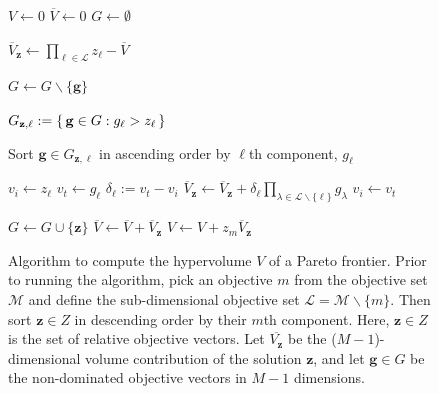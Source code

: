 \begin{figure}[ht]
\caption[Algorithm to compute the hypervolume indicator of a Pareto frontier]{Algorithm to compute the hypervolume $V$ of a Pareto frontier. Prior to running the algorithm, pick an objective $m$ from the objective set $\mathcal{M}$ and define the sub-dimensional objective set $\mathcal{L} = \mathcal{M} \backslash \{m\}$. Then sort $\mathbf{z} \in Z$ in descending order by their $m$th component. Here, $\mathbf{z} \in Z$ is the set of relative objective vectors. Let $\overbar{V_\mathbf{z}}$ be the ($M-1$)-dimensional volume contribution of the solution $\mathbf{z}$, and let $\mathbf{g} \in G$ be the non-dominated objective vectors in $M-1$ dimensions.}
\label{algo:HypervolAlgo}
\begin{algorithmic}[1]

\State $V \gets 0$
\State $\overbar{V} \gets 0$
\State $G \gets \emptyset$


	\State $\overbar{V}_\mathbf{z} \gets \prod_{\ell \in \mathcal{L}} z_\ell - \overbar{V}$
		
			\State $G \gets G \backslash \{\mathbf{g}\}$
		\EndIf
	\EndFor
	
	
		\State $G_{\mathbf{z},\ell} := \set{\mathbf{g} \in G : g_\ell > z_\ell}$
		
		\State Sort $\mathbf{g} \in G_{\mathbf{z},\ell}$ in ascending order by $\ell$th component, $g_\ell$
		
		\State $v_i \gets z_\ell$
			\State $v_t \gets g_\ell$
			\State $\delta_\ell := v_t - v_i$
			\State $\overbar{V}_\mathbf{z} \gets \overbar{V}_\mathbf{z} + \delta_\ell \prod_{\lambda \in \mathcal{L} \backslash \{\ell\}} g_\lambda$
			\State $v_i \gets v_t$
		\EndFor
		
	\EndFor
	
	\State $G \gets G \cup \{\mathbf{z}\}$
	\State $\overbar{V} \gets \overbar{V} + \overbar{V}_\mathbf{z}$
	\State $V \gets V + z_m \overbar{V}_\mathbf{z}$
\EndFor


\end{algorithmic}
\end{figure}

